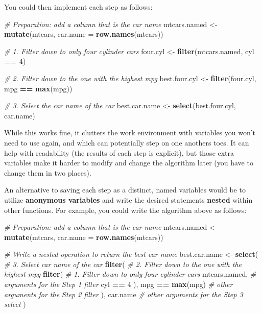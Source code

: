 \documentclass[]{book}
\newenvironment{Shaded}{\begin{snugshade}}{\end{snugshade}}
\newcommand{\KeywordTok}[1]{\textcolor[rgb]{0.13,0.29,0.53}{\textbf{#1}}}
\newcommand{\DataTypeTok}[1]{\textcolor[rgb]{0.13,0.29,0.53}{#1}}
\newcommand{\DecValTok}[1]{\textcolor[rgb]{0.00,0.00,0.81}{#1}}
\newcommand{\StringTok}[1]{\textcolor[rgb]{0.31,0.60,0.02}{#1}}
\newcommand{\CommentTok}[1]{\textcolor[rgb]{0.56,0.35,0.01}{\textit{#1}}}
\newcommand{\OperatorTok}[1]{\textcolor[rgb]{0.81,0.36,0.00}{\textbf{#1}}}
\newcommand{\NormalTok}[1]{#1}
\theoremstyle{definition}
\theoremstyle{definition}
\theoremstyle{remark}
\begin{document}
You could then implement each step as follows:

\begin{Shaded}
\begin{Highlighting}[]
\CommentTok{# Preparation: add a column that is the car name}
\NormalTok{mtcars.named <-}\StringTok{ }\KeywordTok{mutate}\NormalTok{(mtcars, }\DataTypeTok{car.name =} \KeywordTok{row.names}\NormalTok{(mtcars))}

\CommentTok{# 1. Filter down to only four cylinder cars}
\NormalTok{four.cyl <-}\StringTok{ }\KeywordTok{filter}\NormalTok{(mtcars.named, cyl }\OperatorTok{==}\StringTok{ }\DecValTok{4}\NormalTok{)}

\CommentTok{# 2. Filter down to the one with the highest mpg}
\NormalTok{best.four.cyl <-}\StringTok{ }\KeywordTok{filter}\NormalTok{(four.cyl, mpg }\OperatorTok{==}\StringTok{ }\KeywordTok{max}\NormalTok{(mpg))}

\CommentTok{# 3. Select the car name of the car}
\NormalTok{best.car.name <-}\StringTok{ }\KeywordTok{select}\NormalTok{(best.four.cyl, car.name)}
\end{Highlighting}
\end{Shaded}

While this works fine, it clutters the work environment with variables
you won't need to use again, and which can potentially step on one
anothers toes. It can help with readability (the results of each step is
explicit), but those extra variables make it harder to modify and change
the algorithm later (you have to change them in two places).

An alternative to saving each step as a distinct, named variables would
be to utilize \textbf{anonymous variables} and write the desired
statements \textbf{nested} within other functions. For example, you
could write the algorithm above as follows:

\begin{Shaded}
\begin{Highlighting}[]
\CommentTok{# Preparation: add a column that is the car name}
\NormalTok{mtcars.named <-}\StringTok{ }\KeywordTok{mutate}\NormalTok{(mtcars, }\DataTypeTok{car.name =} \KeywordTok{row.names}\NormalTok{(mtcars))}

\CommentTok{# Write a nested operation to return the best car name}
\NormalTok{best.car.name <-}\StringTok{ }\KeywordTok{select}\NormalTok{(  }\CommentTok{# 3. Select car name of the car}
                  \KeywordTok{filter}\NormalTok{(  }\CommentTok{# 2. Filter down to the one with the highest mpg}
                    \KeywordTok{filter}\NormalTok{( }\CommentTok{# 1. Filter down to only four cylinder cars}
\NormalTok{                      mtcars.named,  }\CommentTok{# arguments for the Step 1 filter}
\NormalTok{                      cyl }\OperatorTok{==}\StringTok{ }\DecValTok{4}
\NormalTok{                    ),}
\NormalTok{                    mpg }\OperatorTok{==}\StringTok{ }\KeywordTok{max}\NormalTok{(mpg)  }\CommentTok{# other arguments for the Step 2 filter}
\NormalTok{                  ),}
\NormalTok{                  car.name  }\CommentTok{# other arguments for the Step 3 select}
\NormalTok{                )}
\end{Highlighting}
\end{Shaded}
\end{document}
